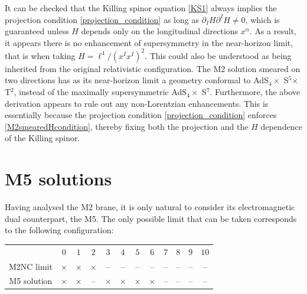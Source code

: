 \documentclass[11pt]{article}
\newcommand\adsS[2]{AdS${}_{#1} \times $ S${}^{#2}$}
\numberwithin{equation}{section}
\begin{document}
{{It can be checked that the Killing spinor equation \eqref{KS1} always implies the projection condition \eqref{projection_condition} as long as $\partial_I H \partial^I H \neq 0$, which is guaranteed unless $H$ depends only on the longitudinal directions $x^\alpha$.
As a result, it appears there is no enhancement of supersymmetry in the near-horizon limit, that is when taking $H = \ell^4 / ( x^I x^I)^2$.
This could also be understood as being inherited from the original relativistic configuration.
The M2 solution smeared on two directions has as its near-horizon limit a geometry conformal to \adsS{4}{5}$\times$ T${}^2$, instead of the maximally supersymmetric \adsS{4}{7}.
Furthermore, the above derivation appears to rule out any non-Lorentzian enhancements. This is essentially because the projection condition \eqref{projection_condition} enforces \eqref{M2smearedHcondition}, thereby fixing both the projection and the $H$ dependence of the Killing spinor.

\section{M5 solutions} 
\label{sec:M5}

Having analysed the M2 brane, it is only natural to consider its electromagnetic dual counterpart, the M5.
The only possible limit that can be taken corresponds to the following configuration:

\begin{center}
\begin{tabular}{c|c|c|c|c|c|c|c|c|c|c|c|}
 & $0$ &  $1$ & $2$ & $3$ & $4$ & $5$ & $6$ & $7$ & $8$ & $9$ & ${10}$ \\
M2NC limit & $\times$ & $\times$&  $\times$ & --& --& --& --& --&-- &-- & -- \\
M5 solution & $\times$  & $\times$ &-- &$\times$ & $\times$ &$\times$ &$\times$  &-- &-- & -- &--\\[4pt]
\end{tabular}
\end{center}

}}
\end{document}
